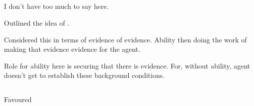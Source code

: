 \subsection{\AR{}}
\label{sec:ar-2}

\begin{note}
  I don't have too much to say here.

  Outlined the idea of \AR{}.

  Considered this in terms of evidence of evidence.
  Ability then doing the work of making that evidence evidence for the agent.

  Role for ability here is securing that there is evidence.
  For, without ability, agent doesn't get to establish these background conditions.
\end{note}

\subsection{\WR{}}
\label{sec:wr-2}

\begin{note}
  Favoured
\end{note}


